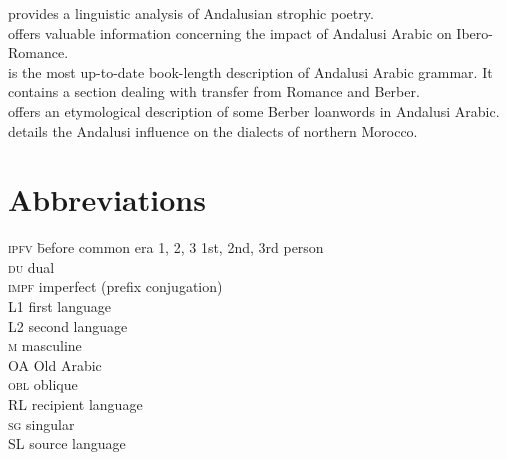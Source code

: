 \documentclass[output=paper,modfonts,nonflat]{langsci/langscibook}
\begin{document}
\citet{Corriente1997poetry} provides a linguistic analysis of Andalusian strophic poetry.\\
\citet{Corriente2005} offers valuable information concerning the impact of Andalusi Arabic on Ibero-Romance.\\
\citet{CorrientePereiraVicente2015} is the most up-to-date book-length description of Andalusi Arabic grammar. It contains a section dealing with transfer from Romance and Berber.\\ 
\citet{Ferrando1997} offers an etymological description of some Berber loanwords in Andalusi Arabic.\\ 
\citet{Vicente2010} details the Andalusi influence on the dialects of northern Morocco. 


\section*{Abbreviations}
\begin{multicols}{2}
\begin{tabbing}
\textsc{ipfv} \hspace{1em} \= before common era\kill
\textsc{1, 2, 3} \> 1st, 2nd, 3rd person \\
\textsc{du} \> dual \\
\textsc{impf} \> imperfect (prefix conjugation) \\
L1 \> first language \\
L2 \> second language \\
\textsc{m} \> masculine \\
OA \> Old Arabic \\
\textsc{obl} \> oblique \\
RL \> recipient language \\
\textsc{sg} \> singular \\
SL \> source language
\end{tabbing}
\end{multicols}



\sloppy\printbibliography[heading=subbibliography,notkeyword=this]
\end{document}
